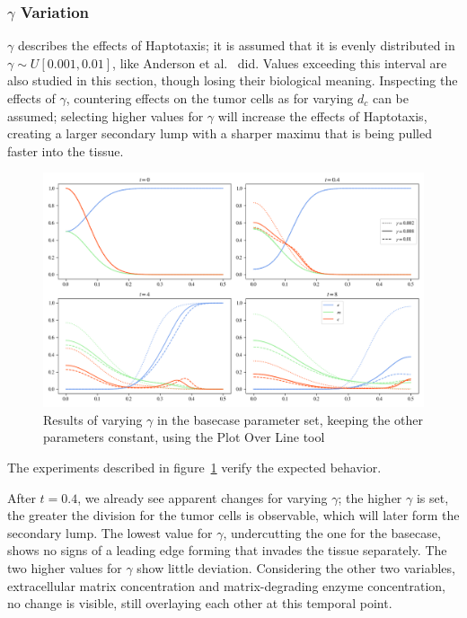 \subsubsection*{$\gamma$ Variation}
$\gamma$ describes the effects of Haptotaxis; it is assumed that it is evenly distributed in $\gamma \sim U[0.001,0.01]$, like Anderson et al.~\cite{anderson_mathematical_2000} did. Values exceeding this interval are also studied in this section, though losing their biological meaning. Inspecting the effects of $\gamma$, countering effects on the tumor cells as for varying $d_c$ can be assumed; selecting higher values for $\gamma$ will increase the effects of Haptotaxis, creating a larger secondary lump with a sharper maximu that is being pulled faster into the tissue.
\begin{figure}[h!]
 \centering
 \includegraphics[width=\textwidth]{resources/images/gamma_variation.png}
 \caption{Results of varying $\gamma$ in the basecase parameter set, keeping the other parameters constant, using the Plot Over Line tool}
 \label{fig:gamma_variation}
\end{figure}
The experiments described in figure~\ref{fig:gamma_variation} verify the expected behavior.

After $t=0.4$, we already see apparent changes for varying $\gamma$; the higher $\gamma$ is set, the greater the division for the tumor cells is observable, which will later form the secondary lump. The lowest value for $\gamma$, undercutting the one for the basecase, shows no signs of a leading edge forming that invades the tissue separately. The two higher values for $\gamma$ show little deviation. Considering the other two variables, extracellular matrix concentration and matrix-degrading enzyme concentration, no change is visible, still overlaying each other at this temporal point.

